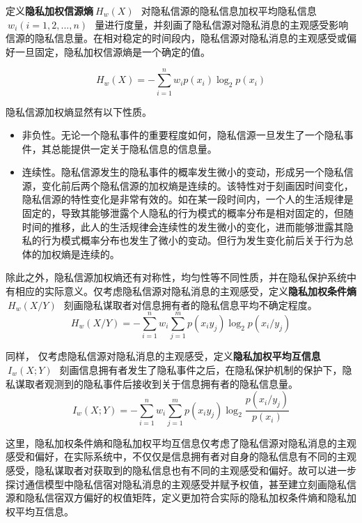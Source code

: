 定义\textbf{隐私加权信源熵}$~H_{w}(X)~$~对隐私信源的隐私信息加权平均隐私信息~$~w_{i}(i=1,2,...,n)~$~量进行度量，并刻画了隐私信源对隐私消息的主观感受影响信源的隐私信息量。在相对稳定的时间段内，隐私信源对隐私消息的主观感受或偏好一旦固定，隐私加权信源熵是一个确定的值。

\begin{equation}
H_{w}(X)=-\sum_{i=1}^{n}w_{i}p(x_{i})\log_{2}p(x_{i})
\end{equation}

隐私信源加权熵显然有以下性质。
\begin{itemize}
	\item 非负性。无论一个隐私事件的重要程度如何，隐私信源一旦发生了一个隐私事件，其总能提供一定关于隐私信息的信息量。
	\item 连续性。隐私信源发生的隐私事件的概率发生微小的变动，形成另一个隐私信源，变化前后两个隐私信源的加权熵是连续的。该特性对于刻画因时间变化，隐私信源的特性变化是非常有效的。如在某一段时间内，一个人的生活规律是固定的，导致其能够泄露个人隐私的行为模式的概率分布是相对固定的，但随时间的推移，此人的生活规律会连续性的发生微小的变化，进而能够泄露其隐私的行为模式概率分布也发生了微小的变动。但行为发生变化前后关于行为总体的加权熵是连续的。
\end{itemize}

除此之外，隐私信源加权熵还有对称性，均匀性等不同性质，并在隐私保护系统中有相应的实际意义。仅考虑隐私信源对隐私消息的主观感受，定义\textbf{隐私加权条件熵}$~H_{w}(X/Y)~$~刻画隐私谋取者对信息拥有者的隐私信息平均不确定程度。
\begin{equation}
H_{w}(X/Y)=-\sum_{i=1}^{n}w_{i}\sum_{j=1}^{m}p(x_{i}y_{j})\log_{2}p(x_{i}/y_{j})
\end{equation}

同样， 仅考虑隐私信源对隐私消息的主观感受，定义\textbf{隐私加权平均互信息}$~I_{w}(X;Y)~$~刻画信息拥有者发生了隐私事件之后，在隐私保护机制的保护下，隐私谋取者观测到的隐私事件后接收到关于信息拥有者的隐私信息量。
\begin{equation}
I_{w}(X;Y)=-\sum_{i=1}^{n}w_{i}\sum_{j=1}^{m}p(x_{i}y_{j})\log_{2}\frac{p(x_{i}/y_{j})}{p(x_{i})}
\end{equation}

这里，隐私加权条件熵和隐私加权平均互信息仅考虑了隐私信源对隐私消息的主观感受和偏好，在实际系统中，不仅仅是信息拥有者对自身的隐私信息有不同的主观感受，隐私谋取者对获取到的隐私信息也有不同的主观感受和偏好。故可以进一步探讨通信模型中隐私信宿对隐私消息的主观感受并赋予权值，甚至建立刻画隐私信源和隐私信宿双方偏好的权值矩阵，定义更加符合实际的隐私加权条件熵和隐私加权平均互信息。

